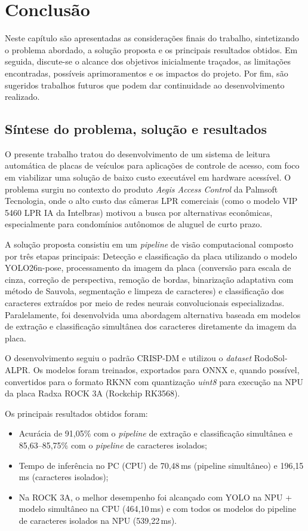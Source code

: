 \chapter{Conclusão}

Neste capítulo são apresentadas as considerações finais do trabalho, sintetizando o problema abordado, a solução proposta e os principais resultados obtidos. Em seguida, discute-se o alcance dos objetivos inicialmente traçados, as limitações encontradas, possíveis aprimoramentos e os impactos do projeto. Por fim, são sugeridos trabalhos futuros que podem dar continuidade ao desenvolvimento realizado.

\section{Síntese do problema, solução e resultados}

O presente trabalho tratou do desenvolvimento de um sistema de leitura automática de placas de veículos para aplicações de controle de acesso, com foco em viabilizar uma solução de baixo custo executável em hardware acessível. O problema surgiu no contexto do produto \textit{Aegis Access Control} da Palmsoft Tecnologia, onde o alto custo das câmeras LPR comerciais (como o modelo VIP 5460 LPR IA da Intelbras) motivou a busca por alternativas econômicas, especialmente para condomínios autônomos de aluguel de curto prazo.

A solução proposta consistiu em um \textit{pipeline} de visão computacional composto por três etapas principais: Detecção e classificação da placa utilizando o modelo YOLO26n-pose, processamento da imagem da placa (conversão para escala de cinza, correção de perspectiva, remoção de bordas, binarização adaptativa com método de Sauvola, segmentação e limpeza de caracteres) e classificação dos caracteres extraídos por meio de redes neurais convolucionais especializadas. Paralelamente, foi desenvolvida uma abordagem alternativa baseada em modelos de extração e classificação simultânea dos caracteres diretamente da imagem da placa.

O desenvolvimento seguiu o padrão CRISP-DM e utilizou o \textit{dataset} RodoSol-ALPR. Os modelos foram treinados, exportados para ONNX e, quando possível, convertidos para o formato RKNN com quantização \textit{uint8} para execução na NPU da placa Radxa ROCK 3A (Rockchip RK3568).

Os principais resultados obtidos foram:

\begin{itemize}
    \item Acurácia de 91,05\% com o \textit{pipeline} de extração e classificação simultânea e 85,63--85,75\% com o \textit{pipeline} de caracteres isolados;
    \item Tempo de inferência no PC (CPU) de 70,48\,ms (pipeline simultâneo) e 196,15\,ms (caracteres isolados);
    \item Na ROCK 3A, o melhor desempenho foi alcançado com YOLO na NPU + modelo simultâneo na CPU (464,10\,ms) e com todos os modelos do pipeline de caracteres isolados na NPU (539,22\,ms).
\end{itemize}

